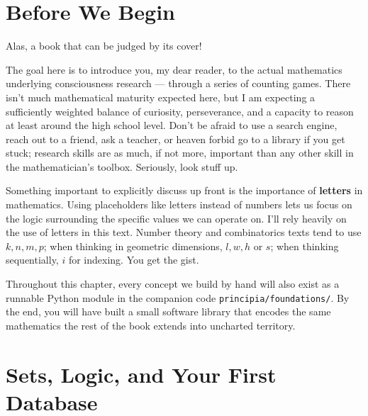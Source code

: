 %
%
%

\section*{Before We Begin}

Alas, a book that can be judged by its cover!

The goal here is to introduce you, my dear reader, to the actual mathematics
underlying consciousness research --- through a series of counting games.
There isn't much mathematical maturity expected here, but I am expecting a
sufficiently weighted balance of curiosity, perseverance, and a capacity to
reason at least around the high school level. Don't be afraid to use a search
engine, reach out to a friend, ask a teacher, or heaven forbid go to a library
if you get stuck; research skills are as much, if not more, important than any
other skill in the mathematician's toolbox. Seriously, look stuff up.

Something important to explicitly discuss up front is the importance of
\textbf{letters} in mathematics. Using placeholders like letters instead of
numbers lets us focus on the logic surrounding the specific values we can
operate on. I'll rely heavily on the use of letters in this text. Number
theory and combinatorics texts tend to use $k, n, m, p$; when thinking in
geometric dimensions, $l, w, h$ or $s$; when thinking sequentially, $i$
for indexing. You get the gist.

Throughout this chapter, every concept we build by hand will also exist as a
runnable Python module in the companion code \texttt{principia/foundations/}.
By the end, you will have built a small software library that encodes the same
mathematics the rest of the book extends into uncharted territory.

\section{Sets, Logic, and Your First Database}

